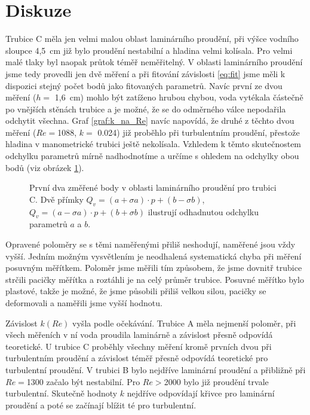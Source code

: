 \section*{Diskuze}


Trubice C měla jen velmi malou oblast laminárního proudění, při výšce vodního sloupce 4,5~cm již bylo proudění nestabilní a hladina velmi kolísala. Pro velmi malé tlaky byl naopak průtok téměř neměřitelný. V oblasti laminárního proudění jsme tedy provedli jen dvě měření a při fitování závislosti \eqref{eq:fit} jsme měli k dispozici stejný počet bodů jako fitovaných parametrů. Navíc první ze dvou měření ($h =$ 1,6~cm) mohlo být zatíženo hrubou chybou, voda vytékala částečně po vnějších stěnách trubice a je možné, že se do odměrného válce nepodařila odchytit všechna. Graf \ref{graf:k_na_Re} navíc napovídá, že druhé z těchto dvou měření ($Re =$1088, $k =$ 0.024) již proběhlo při turbulentním proudění, přestože hladina v manometrické trubici ještě nekolísala. Vzhledem k těmto skutečnostem odchylku parametrů mírně nadhodnotíme a určíme s ohledem na odchylky obou bodů (viz obrázek \ref{graf:chybaC}).


\begin{figure}[htbp] 
\centering

\caption{ První dva změřené body v oblasti laminárního proudění pro trubici C. Dvě přímky \mbox{$Q_v=(a+\sigma a)\cdot p+(b-\sigma b)$}, \mbox{$Q_v=(a-\sigma a)\cdot p+(b+\sigma b)$} ilustrují odhadnutou odchylku parametrů $a$ a $b$.}
\label{graf:chybaC}
\end{figure}

Opravené poloměry se s těmi naměřenými přiliš neshodují, naměřené jsou vždy vyšší. Jedním možným vysvětlením je neodhalená systematická chyba při měření posuvným měřítkem. Poloměr jsme měřili tím způsobem, že jsme dovnitř trubice strčili pacičky měřítka a roztáhli je na celý průměr trubice. Posuvné měřítko bylo plastové, takže je možné, že jsme působili přiliš velkou silou, pacičky se deformovali a naměřili jsme vyšší hodnotu.

Závislost $k(Re)$ vyšla podle očekávání. Trubice A měla nejmenší poloměr, při všech měřeních v ní voda proudila laminárně a závislost přesně odpovídá teoretické. U trubice C proběhly všechny měření kromě prvních dvou při turbulentním proudění a závislost téměř přesně odpovídá teoretické pro turbulentní proudění. V trubici B bylo nejdříve laminární proudění a přibližně při $Re=$1300 začalo být nestabilní. Pro $Re>$2000 bylo již proudění trvale turbulentní. Skutečně hodnoty $k$ nejdříve odpovídají křivce pro laminární proudění a poté se začínají blížit té pro turbulentní.